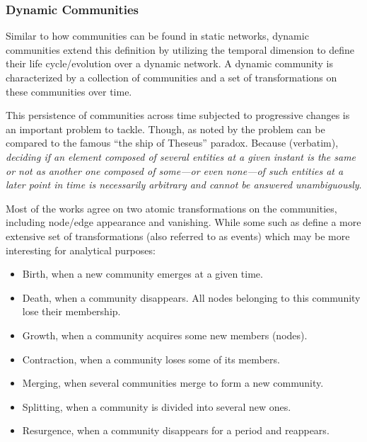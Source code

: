 \documentclass[
acmsmall,
nonacm,
screen,
acmthm]{../../scripts/pandoc/templates/acmart}
\providecommand{\tightlist}{%
\setlength{\itemsep}{0pt}\setlength{\parskip}{0pt}}
\begin{document}
\hypertarget{dynamic-communities}{%
\subsubsection{Dynamic Communities}\label{dynamic-communities}}

Similar to how communities can be found in static networks, dynamic
communities extend this definition by utilizing the temporal dimension
to define their life cycle/evolution over a dynamic network. A dynamic
community is characterized by a collection of communities and a set of
transformations on these communities over time.

This persistence of communities across time subjected to progressive
changes is an important problem to tackle. Though, as noted by
\citep{rossettiCommunityDiscoveryDynamic2018} the problem can be
compared to the famous ``the ship of Theseus'' paradox. Because
(verbatim), \emph{deciding if an element composed of several entities at
a given instant is the same or not as another one composed of some---or
even none---of such entities at a later point in time is necessarily
arbitrary and cannot be answered unambiguously}.

Most of the works agree on two atomic transformations on the
communities, including node/edge appearance and vanishing. While some
such as
\citep[\citet{cazabetUsingDynamicCommunity2012}]{pallaQuantifyingSocialGroup2007, asurEventbasedFrameworkCharacterizing2009}
define a more extensive set of transformations (also referred to as
events) which may be more interesting for analytical purposes:

\begin{itemize}
\tightlist
\item
  Birth, when a new community emerges at a given time.~
\item
  Death, when a community disappears. All nodes belonging to this
  community lose their membership.
\item
  Growth, when a community acquires some new members (nodes).
\item
  Contraction, when a community loses some of its members.
\item
  Merging, when several communities merge to form a new community.
\item
  Splitting, when a community is divided into several new ones.
\item
  Resurgence, when a community disappears for a period and reappears.
\end{itemize}
\end{document}
